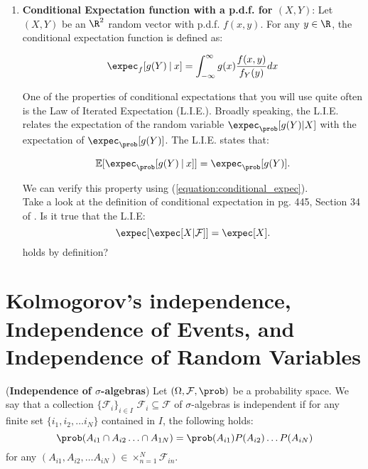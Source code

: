 \documentclass[11pt]{article} %
\begin{document}
\begin{enumerate}
\item \textbf{Conditional Expectation function with a p.d.f. for $(X, Y)$}:  Let $(X,Y)$ be an $\R^2$ random vector with p.d.f. $f(x,y)$. For any $y \in \R$, the conditional expectation function is defined as: 

\begin{equation} \label{equation:conditional_expec}
\expec_{f}[g(Y)\: | \: x ] = \int_{-\infty}^{\infty} g(x)\frac{f(x,y)}{f_{Y}(y)}dx 
\end{equation}

One of the properties of conditional expectations that you will use quite often is the Law of Iterated Expectation (L.I.E.). Broadly speaking, the L.I.E. relates the expectation of the random variable $\expec_{\prob}[g(Y) | X]$ with the expectation of $\expec_{\prob}[g(Y)]$. The L.I.E. states that:

\begin{equation}
\mathbb{E}[\expec_{\prob}[g(Y)\: | \: x ]]=\expec_{\prob}[g(Y)].
\end{equation}

We can verify this property using (\ref{equation:conditional_expec}).\\

 Take a look at the definition of conditional expectation in pg. 445, Section 34 of \cite{Billingsley95}. Is it true that the L.I.E:
$$\expec[ \expec[X | \mathcal{F}] ] = \expec[X].$$
\noindent holds by definition? 
\end{enumerate}



\newpage





\newpage

\appendix

\section{Kolmogorov's independence, Independence of Events, and Independence of Random Variables} 

\begin{definition} (\textbf{Independence of $\sigma$-algebras}) Let $(\Omega, \mathcal{F}, \prob)$ be a probability space. We say that a collection $\{\mathcal{F}_i\}_{i \in I}$  $\mathcal{F}_i \subseteq \mathcal{F}$ of $\sigma$-algebras is independent if for any finite set $\{i_1, i_2, \ldots i_N\}$ contained in $I$, the following holds:
\begin{equation*}
	\prob(A_{i1} \cap A_{i2} \ldots \cap A_{1N})=\prob(A_{i1}) P(A_{i2}) \ldots P(A_{iN}) 
\end{equation*}
for any $(A_{i1}, A_{i2}, \ldots A_{iN}) \in \times_{n=1}^{N} \mathcal{F}_{in}.$  
\end{definition}
\end{document}
